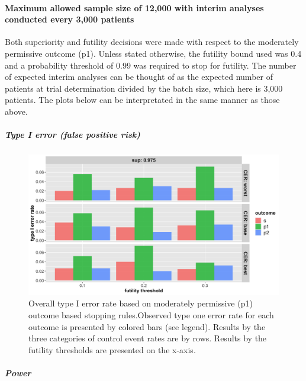 \documentclass[]{article}
\let\oldparagraph\paragraph
\renewcommand{\paragraph}[1]{\oldparagraph{#1}\mbox{}}
\let\oldsubparagraph\subparagraph
\renewcommand{\subparagraph}[1]{\oldsubparagraph{#1}\mbox{}}
\begin{document}
\hypertarget{maximum-allowed-sample-size-of-12000-with-interim-analyses-conducted-every-3000-patients}{%
\paragraph{Maximum allowed sample size of 12,000 with interim analyses
conducted every 3,000
patients}\label{maximum-allowed-sample-size-of-12000-with-interim-analyses-conducted-every-3000-patients}}

Both superiority and futility decisions were made with respect to the
moderately permissive outcome (p1). Unless stated otherwise, the
futility bound used was 0.4 and a probability threshold of 0.99 was
required to stop for futility. The number of expected interim analyses
can be thought of as the expected number of patients at trial
determination divided by the batch size, which here is 3,000 patients.
The plots below can be interpretated in the same manner as those above.

\hypertarget{type-i-error-false-positive-risk-2}{%
\subparagraph{Type I error (false positive
risk)}\label{type-i-error-false-positive-risk-2}}

\captionsetup[figure]{font=small,labelfont=small}

\begin{figure}
  \caption{Overall type I error rate based on moderately permissive (p1) outcome based stopping rules.Observed type one error rate for each outcome is
  presented by colored bars (see legend). Results by the three categories of control event rates are by rows. Results by the futility thresholds are
  presented on the x-axis.}
  \includegraphics{../p1_plots/batch_size_nb_3000/type_1_error_p1.png}
\end{figure}

\hypertarget{power-2}{%
\subparagraph{Power}\label{power-2}}
\end{document}
